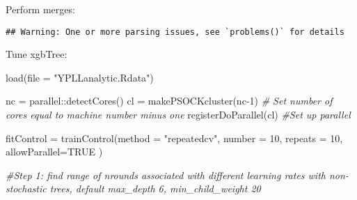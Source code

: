 \documentclass[
]{article}
\newenvironment{Shaded}{\begin{snugshade}}{\end{snugshade}}
\newcommand{\AttributeTok}[1]{\textcolor[rgb]{0.77,0.63,0.00}{#1}}
\newcommand{\CommentTok}[1]{\textcolor[rgb]{0.56,0.35,0.01}{\textit{#1}}}
\newcommand{\ConstantTok}[1]{\textcolor[rgb]{0.00,0.00,0.00}{#1}}
\newcommand{\DecValTok}[1]{\textcolor[rgb]{0.00,0.00,0.81}{#1}}
\newcommand{\FunctionTok}[1]{\textcolor[rgb]{0.00,0.00,0.00}{#1}}
\newcommand{\NormalTok}[1]{#1}
\newcommand{\OtherTok}[1]{\textcolor[rgb]{0.56,0.35,0.01}{#1}}
\newcommand{\SpecialCharTok}[1]{\textcolor[rgb]{0.00,0.00,0.00}{#1}}
\newcommand{\StringTok}[1]{\textcolor[rgb]{0.31,0.60,0.02}{#1}}
\begin{document}
Perform merges:

\begin{verbatim}
## Warning: One or more parsing issues, see `problems()` for details
\end{verbatim}

Tune xgbTree:

\begin{Shaded}
\begin{Highlighting}[]
\FunctionTok{load}\NormalTok{(}\AttributeTok{file =} \StringTok{"YPLLanalytic.Rdata"}\NormalTok{)}

\NormalTok{nc }\OtherTok{=}\NormalTok{ parallel}\SpecialCharTok{::}\FunctionTok{detectCores}\NormalTok{()  }
\NormalTok{cl }\OtherTok{=} \FunctionTok{makePSOCKcluster}\NormalTok{(nc}\DecValTok{{-}1}\NormalTok{)   }\CommentTok{\# Set number of cores equal to machine number minus one}
\FunctionTok{registerDoParallel}\NormalTok{(cl)        }\CommentTok{\#Set up parallel}

\NormalTok{fitControl }\OtherTok{=} \FunctionTok{trainControl}\NormalTok{(}\AttributeTok{method =} \StringTok{"repeatedcv"}\NormalTok{,}
                          \AttributeTok{number =} \DecValTok{10}\NormalTok{,}
                          \AttributeTok{repeats =} \DecValTok{10}\NormalTok{,}
                          \AttributeTok{allowParallel=}\ConstantTok{TRUE}
\NormalTok{)}

\CommentTok{\#Step 1: find range of nrounds associated with different learning rates with non{-}stochastic trees, default max\_depth 6, min\_child\_weight 20}


\end{Highlighting}
\end{Shaded}
\end{document}
